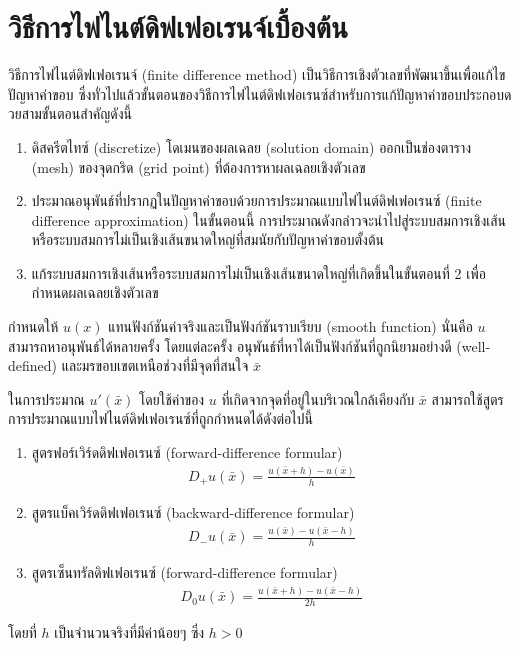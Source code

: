 \section{วิธีการไฟไนต์ดิฟเฟอเรนจ์เบื้องต้น}
\hspace{1cm}

\hspace{1cm} วิธีการไฟไนต์ดิฟเฟอเรนจ์ (finite difference method)  เป็นวิธีการเชิงตัวเลขที่พัฒนาขึ้นเพื่อแก้ไขปัญหาค่าขอบ ซึ่งทั่วไปแล้วขั้นตอนของวิธีการไฟไนต์ดิฟเฟอเรนซ์สำหรับการแก้ปัญหาค่าขอบประกอบดวยสามขั้นตอนสำคัญดังนี้

\begin{enumerate}
    \item ดิสครีตไทซ์ (discretize) โดเมนของผลเฉลย (solution domain) ออกเป็นช่องตาราง (mesh) ของจุดกริด (grid point) ที่ต้องการหาผลเฉลยเชิงตัวเลข
    \item ประมาณอนุพันธ์ที่ปรากฏในปัญหาค่าขอบด้วยการประมาณแบบไฟไนต์ดิฟเฟอเรนซ์ (finite difference approximation) ในขั้นตอนนี้ การประมาณดังกล่าวจะนำไปสู่ระบบสมการเชิงเส้น หรือระบบสมการไม่เป็นเชิงเส้นขนาดใหญ่ที่สมนัยกับปัญหาค่าขอบตั้งต้น
    \item แก้ระบบสมการเชิงเส้นหรือระบบสมการไม่เป็นเชิงเส้นขนาดใหญ่ที่เกิดขึ้นในขั้นตอนที่ 2 เพื่อกำหนดผลเฉลยเชิงตัวเลข
\end{enumerate}

\hspace{1cm} กำหนดให้ $u(x)$ แทนฟังก์ชันค่าจริงและเป็นฟังก์ชันราบเรียบ (smooth function) นั่นคือ $u$ สามารถหาอนุพันธ์ได้หลายครั้ง โดยแต่ละครั้ง อนุพันธ์ที่หาได้เป็นฟังก์ชันที่ถูกนิยามอย่างดี (well-defined) และมรขอบเขตเหนือช่วงที่มีจุดที่สนใจ $\bar{x}$

\hspace{1cm} ในการประมาณ $u'(\bar{x})$ โดยใช้ค่าของ $u$ ที่เกิดจากจุดที่อยู่ในบริเวณใกล้เคียงกับ $\bar{x}$ สามารถใช้สูตรการประมาณแบบไฟไนต์ดิฟเฟอเรนซ์ที่ถูกกำหนดได้ดังต่อไปนี้
\begin{enumerate}
    \item สูตรฟอร์เวิร์ดดิฟเฟอเรนซ์ (forward-difference formular) 
    \begin{align*}
        D_{+}u(\bar{x}) = \frac{u(\bar{x}+h) - u(\bar{x})}{h}    
    \end{align*}
    \item สูตรแบ็คเวิร์ดดิฟเฟอเรนซ์ (backward-difference formular) 
    \begin{align*}
        D_{-}u(\bar{x}) = \frac{u(\bar{x}) - u(\bar{x}-h)}{h}    
    \end{align*}
    \item สูตรเซ็นทรัลดิฟเฟอเรนซ์ (forward-difference formular) 
    \begin{align*}
        D_{0}u(\bar{x}) = \frac{u(\bar{x}+h) - u(\bar{x}-h)}{2h}    
    \end{align*}
\end{enumerate}
โดยที่ $h$ เป็นจำนวนจริงที่มีค่าน้อยๆ ซึ่ง $h>0$ 

